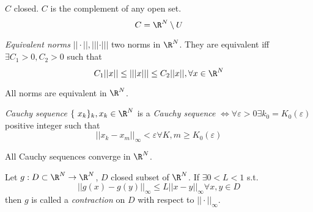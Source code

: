 \begin{definition}
  $C$ closed.
  \newline $C$ is the complement of any open set.
    $$C=\R^N\setminus U $$
\end{definition}

\begin{definition}
  \emph{Equivalent norms}
  \newline $|| \cdot ||, ||| \cdot |||$ two norms in $\R^N$. They are equivalent iff $\exists C_1>0, C_2>0$ such that
    $$C_1 || x || \leq |||x||| \leq C_2 ||x||, \forall x\in \R^N$$
\end{definition}
\begin{theorem}
  All norms are equivalent in $\R^N$.
\end{theorem}

\begin{definition}
  \emph{Cauchy sequence}
  \newline $\{ x_k \}_k ,x_k\in \R^N$ is a \emph{Cauchy sequence} $\Leftrightarrow \forall \varepsilon >0 \exists k_0=K_0(\varepsilon)$ positive integer such that
    $$||x_k-x_m||_{\infty}<\varepsilon \forall K,m \geq K_0(\varepsilon)$$
\end{definition}

\begin{theorem}
    All Cauchy sequences converge in $\R^N$.
\end{theorem}

\begin{definition}
  Let $g: D\subset \R^N \to \R^N$, $D$ closed subset of $\R^N$.
  \newline If $\exists 0<L<1 $ s.t.
      $$||g(x)-g(y)||_{\infty}\leq L||x-y||_{\infty} \forall x,y \in D$$
    then $g$ is called a \emph{contraction} on $D$ with respect to $|| \cdot ||_{\infty}$.
\end{definition}

